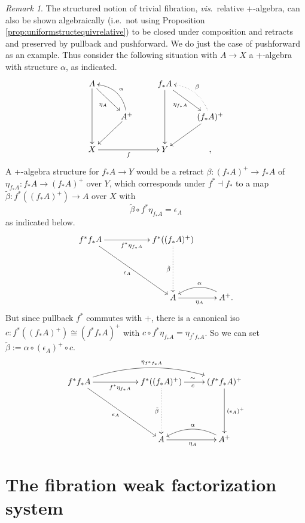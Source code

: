 \documentclass[11pt,reqno]{amsart}
\renewcommand{\to}{\ensuremath{\rightarrow}}
\theoremstyle{remark}
\newtheorem{remark}[theorem]{Remark}
\theoremstyle{definition}
\begin{document}
\begin{remark}\label{trivfibpushforward}
The structured notion of trivial fibration, \emph{vis}.\ relative +-algebra, can also be shown algebraically (i.e.\ not using Proposition \ref{prop:uniformstructequivrelative}) to be closed under composition and retracts and preserved by pullback and pushforward. We do just the case of pushforward as an example.   
Thus consider the following situation with $A\to X$ a +-algebra with structure $\alpha$, as indicated.
\begin{equation}\label{diagram:pushforwardplusalgebras}
\xymatrix{
A \ar[rd]_{\eta_A} \ar[dd]  && f_*A \ar[rd]_{\eta_{f_*A}} \ar[dd] & \\
& A^+ \ar[ld] \ar@/_3ex/ [ul]_\alpha && (f_*A)^+ \ar[ld]  \ar@{.>}@/_3ex/ [ul]_\beta \\
X \ar[rr]_{f} && Y &,
}
\end{equation}
A +-algebra structure for $f_*A \to Y$ would be a retract $\beta : (f_*A)^+ \to f_*A$ of $\eta_{f_*A} : f_*A \to (f_*A)^+$ over $Y$, which corresponds under $f^*\dashv f_*$ to a map $\tilde\beta : f^*((f_*A)^+) \to A$ over $X$ with 
\[
\tilde\beta \circ f^*\eta_{f_*A} = \epsilon_A
\]
as indicated below.
\begin{equation}\label{diagram:pushforwardplusalgebras2}
\xymatrix{
f^*f_*A \ar[rrdd]_{\epsilon_A} \ar[rr]_{f^*\eta_{f_*A}} 
	&&  f^*((f_*A)^+)  \ar@{.>}[dd]_{\tilde\beta} \\
&&\\
&& A \ar[r]_{\eta_A} & \ar@/_3ex/ [l]_\alpha A^+ .
}
\end{equation}
But since pullback $f^*$ commutes with $+$, there is a canonical iso $c : f^*((f_*A)^+)  \cong (f^*f_*A)^+$ with $ c\circ f^*\eta_{f_*A} = \eta_{f^*f_*A} $. So we can set $\tilde\beta := \alpha\circ(\epsilon_A)^+\circ c$.
\begin{equation}\label{diagram:pushforwardplusalgebras3}
\xymatrix{
f^*f_*A \ar[rrdd]_{\epsilon_A} \ar[rr]_{f^*\eta_{f_*A}}  \ar@/^4ex/ [rrr]^{\eta_{f^*f_*A}} 
	&&  f^*((f_*A)^+)  \ar@{.>}[dd]_{\tilde\beta} \ar[r]^{\sim}_{c}  & (f^*f_*A)^+  \ar[dd]^{(\epsilon_A)^+} \\
&&&\\
&& A \ar[r]_{\eta_{A}} & \ar@/_3ex/ [l]_\alpha A^+ 
}
\end{equation}
\end{remark}

\section{The fibration weak factorization system}\label{sec:fibrations}
\end{document}

